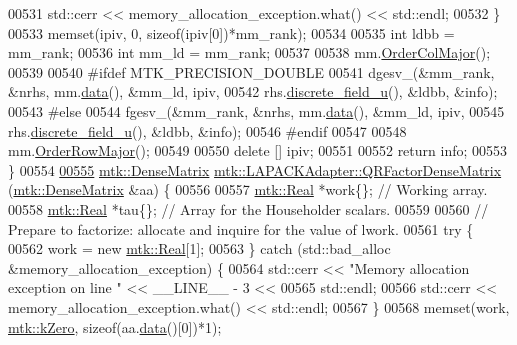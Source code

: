\begin{DoxyCode}
00531     std::cerr << memory\_allocation\_exception.what() << std::endl;
00532   \}
00533   memset(ipiv, 0, \textcolor{keyword}{sizeof}(ipiv[0])*mm\_rank);
00534 
00535   \textcolor{keywordtype}{int} ldbb = mm\_rank;
00536   \textcolor{keywordtype}{int} mm\_ld = mm\_rank;
00537 
00538   mm.\hyperlink{classmtk_1_1DenseMatrix_a59b9bea24acf39dca64e8549b3527463}{OrderColMajor}();
00539 
00540 \textcolor{preprocessor}{  #ifdef MTK\_PRECISION\_DOUBLE}
00541   dgesv\_(&mm\_rank, &nrhs, mm.\hyperlink{classmtk_1_1DenseMatrix_a0c33b8a9e01d157c61ddbdf807c25d84}{data}(), &mm\_ld, ipiv,
00542          rhs.\hyperlink{classmtk_1_1UniStgGrid1D_acf28d702f6e702599986afcb253bbfc1}{discrete\_field\_u}(), &ldbb, &info);
00543 \textcolor{preprocessor}{  #else}
00544   fgesv\_(&mm\_rank, &nrhs, mm.\hyperlink{classmtk_1_1DenseMatrix_a0c33b8a9e01d157c61ddbdf807c25d84}{data}(), &mm\_ld, ipiv,
00545          rhs.\hyperlink{classmtk_1_1UniStgGrid1D_acf28d702f6e702599986afcb253bbfc1}{discrete\_field\_u}(), &ldbb, &info);
00546 \textcolor{preprocessor}{  #endif}
00547 
00548   mm.\hyperlink{classmtk_1_1DenseMatrix_ac2949efba3e8278335d45418c85433e4}{OrderRowMajor}();
00549 
00550   \textcolor{keyword}{delete} [] ipiv;
00551 
00552   \textcolor{keywordflow}{return} info;
00553 \}
00554 
\hypertarget{mtk__lapack__adapter_8cc_source_l00555}{}\hyperlink{classmtk_1_1LAPACKAdapter_ae5c6e78c9c819c9ac7a6f31bfd011d7a}{00555} \hyperlink{classmtk_1_1DenseMatrix}{mtk::DenseMatrix} \hyperlink{classmtk_1_1LAPACKAdapter_ae5c6e78c9c819c9ac7a6f31bfd011d7a}{mtk::LAPACKAdapter::QRFactorDenseMatrix}
      (\hyperlink{classmtk_1_1DenseMatrix}{mtk::DenseMatrix} &aa) \{
00556 
00557   \hyperlink{group__c01-roots_gac080bbbf5cbb5502c9f00405f894857d}{mtk::Real} *work\{\}; \textcolor{comment}{// Working array.}
00558   \hyperlink{group__c01-roots_gac080bbbf5cbb5502c9f00405f894857d}{mtk::Real} *tau\{\};  \textcolor{comment}{// Array for the Householder scalars.}
00559 
00560   \textcolor{comment}{// Prepare to factorize: allocate and inquire for the value of lwork.}
00561   \textcolor{keywordflow}{try} \{
00562     work = \textcolor{keyword}{new} \hyperlink{group__c01-roots_gac080bbbf5cbb5502c9f00405f894857d}{mtk::Real}[1];
00563   \} \textcolor{keywordflow}{catch} (std::bad\_alloc &memory\_allocation\_exception) \{
00564     std::cerr << \textcolor{stringliteral}{"Memory allocation exception on line "} << \_\_LINE\_\_ - 3 <<
00565       std::endl;
00566     std::cerr << memory\_allocation\_exception.what() << std::endl;
00567   \}
00568   memset(work, \hyperlink{group__c01-roots_ga59a451a5fae30d59649bcda274fea271}{mtk::kZero}, \textcolor{keyword}{sizeof}(aa.\hyperlink{classmtk_1_1DenseMatrix_a0c33b8a9e01d157c61ddbdf807c25d84}{data}()[0])*1);

\end{DoxyCode}
